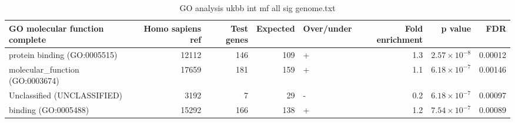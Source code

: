 \begin{table}[ht]
\centering
\begin{adjustbox}{width=\textwidth}
\begin{tabular}{lrrrlrrr}
  \hline
GO molecular function complete & Homo sapiens ref & Test genes & Expected & Over/under & Fold enrichment & p value & FDR \\ 
  \hline
protein binding (GO:0005515) & 12112 & 146 & 109 & + & 1.3 & $2.57 \times 10^{-8}$ & 0.00012 \\ 
  molecular\_function (GO:0003674) & 17659 & 181 & 159 & + & 1.1 & $6.18 \times 10^{-7}$ & 0.00146 \\ 
  Unclassified (UNCLASSIFIED) & 3192 & 7 & 29 & - & 0.2 & $6.18 \times 10^{-7}$ & 0.00097 \\ 
  binding (GO:0005488) & 15292 & 166 & 138 & + & 1.2 & $7.54 \times 10^{-7}$ & 0.00089 \\ 
   \hline
\end{tabular}
\end{adjustbox}
\caption{GO analysis ukbb int mf all sig genome.txt} 
\label{tab:GO analysis ukbb_int_mf_all_sig_genome.txt}
\end{table}



